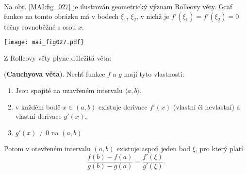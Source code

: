       \begin{tcnote}
        Na obr. \ref{MAI:fig_027} je ilustrován geometrický význam Rolleovy věty. Graf funkce na 
        tomto obrázku má v bodech $\xi_1$, $\xi_2$, v nichž je $f'(\xi_1)=f'(\xi_2)=0$ tečny 
        rovnoběžné s osou $x$. 
        {\centering
        \captionsetup{type=figure}
        \texttt{[image: mai\_fig027.pdf]}
        \par}
      \end{tcnote}
      
      Z Rolleovy věty plyne důležitá věta:
      
      \begin{lemma}\label{MA1:lem_diff04}
        (\textbf{Cauchyova věta}). Nechť funkce $f$ a $g$ mají tyto vlastnosti:
        \begin{enumerate}[noitemsep]
          \item  Jsou spojité na uzavřeném intervalu $\langle a,b\rangle$,
          \item  v každém bodě $x\in(a,b)$ existuje derivace $f'(x)$ (vlastní či nevlastní) a 
                 vlastní derivace $g'(x)$,
          \item  $g'(x)\neq0$ na $(a,b)$
        \end{enumerate}
        Potom v otevřeném intervalu $(a,b)$ existuje aspoň jeden bod $\xi$, pro který platí
        \begin{equation}\label{MA1:eq_diff03}
          \frac{f(b)-f(a)}{g(b)-g(a)} = \frac{f'(\xi)}{g'(\xi)}.
        \end{equation} 
      \end{lemma} 
      
